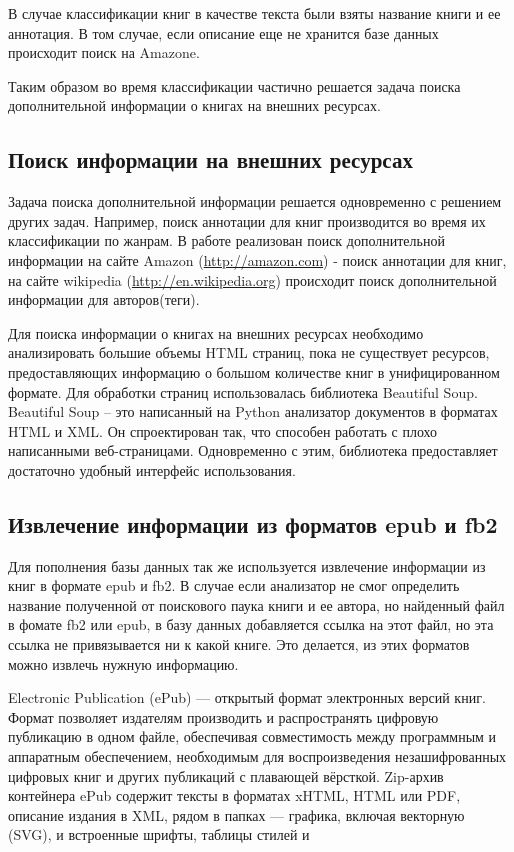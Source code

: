 \documentclass[a4paper]{report}
\begin{document}
В случае классификации книг в качестве текста были взяты название книги и ее аннотация. В том случае, если описание  еще не хранится базе данных происходит поиск на Amazone.

Таким образом во время классификации частично решается задача поиска дополнительной информации о книгах на внешних ресурсах.


\subsection{Поиск информации на внешних ресурсах}

Задача поиска дополнительной информации решается одновременно с решением других задач. Например, поиск аннотации для книг производится во время их классификации по жанрам.
В работе реализован поиск дополнительной информации на сайте Amazon (\url {http://amazon.com}) - поиск аннотации для книг, на сайте wikipedia (\url {http://en.wikipedia.org}) происходит поиск дополнительной информации для авторов(теги).

Для поиска информации о книгах на внешних ресурсах необходимо анализировать большие объемы HTML страниц, \tk пока не существует ресурсов, предоставляющих информацию о большом количестве книг в унифицированном формате. Для обработки страниц использовалась библиотека Beautiful Soup. Beautiful Soup -- это написанный на Python анализатор документов в форматах HTML и XML. Он спроектирован так, что способен работать с плохо написанными  веб-страницами. Одновременно с этим, библиотека предоставляет достаточно удобный интерфейс использования.

\subsection{Извлечение информации из форматов epub и fb2}

Для пополнения базы данных так же используется извлечение информации из книг в формате epub и fb2. В случае если анализатор не смог определить название полученной от поискового паука книги и ее автора, но найденный файл в фомате fb2 или epub, в базу данных добавляется ссылка на этот файл, но эта ссылка не привязывается ни к какой книге. Это делается, \tk из этих форматов можно извлечь нужную информацию. 

Electronic Publication (ePub) — открытый формат электронных версий книг. Формат позволяет издателям производить и распространять цифровую публикацию в одном файле, обеспечивая совместимость между программным и аппаратным обеспечением, необходимым для воспроизведения незашифрованных цифровых книг и других публикаций с плавающей вёрсткой.
Zip-архив контейнера ePub содержит тексты в форматах xHTML, HTML или PDF, описание издания в XML, рядом в папках — графика, включая векторную (SVG), и встроенные шрифты, таблицы стилей и \td 
\end{document}
